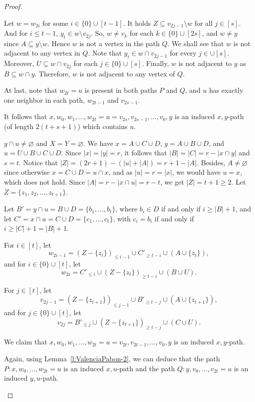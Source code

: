 \documentclass[a4paper,11pt]{article}
\renewcommand{\emptyset}{\varnothing}
\begin{document}
\begin{proof}
\begin{description}
        Let $w=w_{2i}$ for some $i\in \{0\}\cup [t-1]$. It holds $Z\subseteq v_{2j-1}\setminus w$ for all $j\in [s]$. And for $i\leq t-1$, $y_t\in w\setminus v_{2j}$. So, $w\neq v_k$ for each $k\in\{0\}\cup [2s]$, and $w\neq y$ since $A\subseteq y\setminus w$. Hence $w$ is not a vertex in the path $Q$. 
        We shall see that $w$ is not adjacent to any vertex in $Q$. Note that $y_t\in w\cap v_{2j-1}$ for every $j\in\cup[s]$. Moreover, $U\subseteq w\cap v_{2j}$ for each $j\in \{0\}\cup [s]$. Finally, $w$ is not adjacent to $y$ as $B\subseteq w\cap y$. Therefore, $w$ is not adjacent to any vertex of $Q$.  

        At last, note that $w_{2t}=u$ is present in both paths $P$ and $Q$, and $u$ has exactly one neighbor in each path, $w_{2t-1}$ and $v_{2s-1}$.

        It follows that $x,w_0,w_1,\ldots,w_{2t}=u=v_{2s},v_{2s-1},\ldots,v_0,y$ is an induced $x,y$-path (of length $2(t+s+1)$) which contains $u$.
        

        \item[Case 4.] $y\cap u\neq \emptyset$ and $X=Y=\emptyset$. 
        We have $x=A\cup C\cup D$, $y=A\cup B\cup D$, and $u=U\cup B\cup C\cup D$. Since $|x|=|y|=r$, it follows that $|B|=|C|=r-|x\cap y|$ and $s=t$.
        Notice that $|Z|=(2r+1)-(|u|+|A|)=r+1-|A|$. 
        Besides, $A\neq\emptyset$ since otherwise $x=C\cup D=u\cap x$, and as $|u|=r=|x|$, we would have $u=x$, which does not hold. Since $|A|=r-|x \cap u|=r-t$, we get $|Z|=t+1 \geq 2$. Let $Z=\{z_1,z_2,\ldots, z_{t+1}\}$.

        
        Let $B'=y \cap u=B\cup D=\{b_1,\ldots,b_t\}$, where $b_i\in D$ if and only if $i\geq |B|+1$, and let $C'=x \cap u=C\cup D=\{c_1,\ldots,c_t\}$, with $c_i=b_i$ if and only if $i\geq |C|+1=|B|+1$. 

        For $i \in [t]$, let
        $$w_{2i-1}=(Z-\{z_t\})_{\leq i-1} \cup C'_{\geq t-i} \cup (A\cup \{z_t\}),$$ 
        and for $i \in \{0\}\cup[t]$, let
        $$w_{2i}=C'_{\leq i} \cup (Z-\{z_t\})_{\geq t-i} \cup (B\cup U).$$

        For $j \in [t]$, let
        $$v_{2j-1}=(Z-\{z_{t+1}\})_{\leq j-1} \cup B'_{\geq t-j} \cup (A\cup \{z_{t+1}\}),$$ 
        and for $j \in \{0\}\cup[t]$, let
        $$v_{2j}=B'_{\leq j} \cup (Z-\{z_{t+1}\})_{\geq t-j} \cup (C\cup U).$$
   

        We claim that $x,w_0,w_1,\ldots,w_{2t}=u=v_{2t},v_{2t-1},\ldots,v_0,y$ is an induced $x,y$-path.

        Again, using Lemma~\ref{l:ValenciaPabon-2}, we can deduce that the path $P:x,w_0,\ldots,w_{2t}=u$ is an induced $x,u$-path and the path $Q:y,v_0,\ldots,v_{2t}=u$ is an induced $y,u$-path.


\end{description}
\end{proof}
\end{document}
